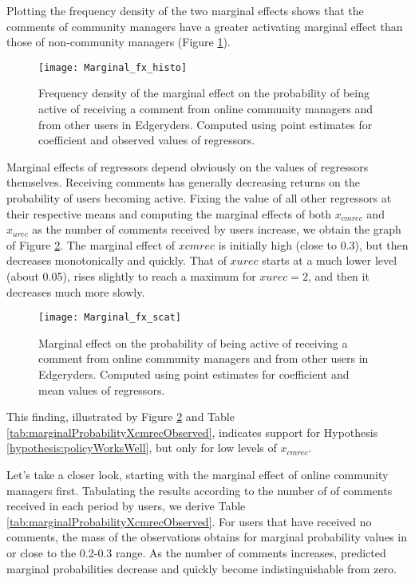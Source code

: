 Plotting the frequency density of the two marginal effects shows that the comments of community managers have a greater activating marginal effect than those of non-community managers (Figure \ref{fig:marginalFxHisto}).

\begin{figure}
	\texttt{[image: Marginal\_fx\_histo]}
	\caption{Frequency density of the marginal effect on the probability of being active of receiving a comment from online community managers and from other users in Edgeryders. Computed using point estimates for coefficient and observed values of regressors.}
\label{fig:marginalFxHisto}
\end{figure}

Marginal effects of regressors depend obviously on the values of regressors themselves. Receiving comments has generally decreasing returns on the probability of users becoming active. Fixing the value of all other regressors at their respective means and computing the marginal effects of both $x_{cmrec}$ and $x_{urec}$ as the number of comments received by users increase, we obtain the graph of Figure \ref{fig:marginalFxScat}. The marginal effect of $x{cmrec}$ is initially high (close to 0.3), but then decreases monotonically and quickly. That of $x{urec}$ starts at a much lower level (about 0.05), rises slightly to reach a maximum for $x{urec} = 2$, and then it decreases much more slowly.

\begin{figure}
	\texttt{[image: Marginal\_fx\_scat]}
	\caption{Marginal effect on the probability of being active of receiving a comment from online community managers and from other users in Edgeryders. Computed using point estimates for coefficient and mean values of regressors.}
\label{fig:marginalFxScat}
\end{figure}

This finding, illustrated by Figure \ref{fig:marginalFxScat} and Table \ref{tab:marginalProbabilityXcmrecObserved}, indicates support for Hypothesis \ref{hypothesis:policyWorksWell}, but only for low levels of $x_{cmrec}$.

Let's take a closer look, starting with the marginal effect of online community managers first. Tabulating the results according to the number of of comments received in each period by users, we derive Table \ref{tab:marginalProbabilityXcmrecObserved}. For users that have received no comments, the mass of the observations obtains for marginal probability values in or close to the 0.2-0.3 range. As the number of comments increases, predicted marginal probabilities decrease and quickly become indistinguishable from zero.

